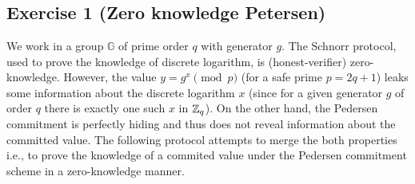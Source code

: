 
\section{}

\subsection{Exercise 1 (Zero knowledge Petersen)}

We work in a group $\mathbb{G}$ of prime order $q$ with generator $g$.
The Schnorr protocol, used to prove the knowledge of discrete
logarithm, is (honest-verifier) zero-knowledge. However, the value
$y=g^x \pmod{p}$ (for a safe prime $p=2q+1$) leaks some information
about the discrete logarithm $x$ (since for a given generator $g$ of
order $q$ there is exactly one such $x$ in $\mathbb{Z}_q$). On the
other hand, the Pedersen commitment is perfectly hiding and thus does
not reveal information about the committed value. The following
protocol attempts to merge the both properties i.e., to prove the
knowledge of a commited value under the Pedersen commitment scheme in
a zero-knowledge manner.

